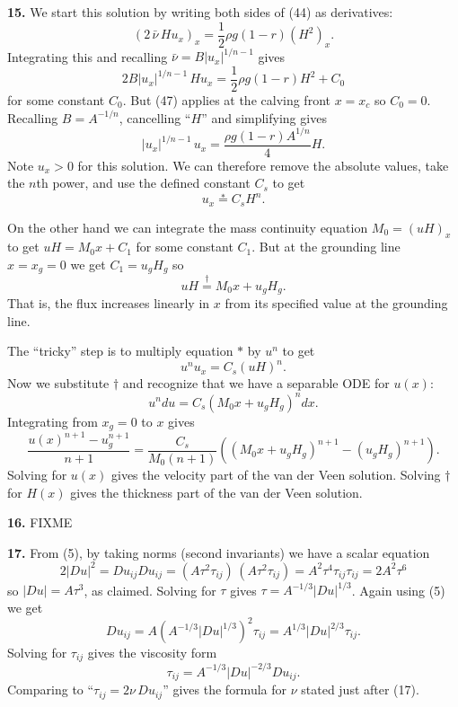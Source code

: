 \documentclass[10pt]{amsart}
\newcommand{\prob}[1]{\bigskip\noindent\large\textbf{#1.}\normalsize }
\begin{document}
\prob{15}  We start this solution by writing both sides of (44) as derivatives:
    $$\left(2 \,\bar\nu\, H u_x\right)_x = \frac{1}{2} \rho g (1-r) (H^2)_x.$$
Integrating this and recalling $\bar\nu = B |u_x|^{1/n - 1}$ gives
    $$2 B |u_x|^{1/n - 1}\, H u_x = \frac{1}{2} \rho g (1-r) H^2 + C_0$$
for some constant $C_0$.  But (47) applies at the calving front $x=x_c$ so $C_0=0$.  Recalling $B=A^{-1/n}$, cancelling ``$H$'' and simplifying gives
    $$|u_x|^{1/n - 1}\, u_x = \frac{\rho g (1-r) A^{1/n}}{4} H.$$
Note $u_x>0$ for this solution.  We can therefore remove the absolute values, take the $n$th power, and use the defined constant $C_s$ to get
    $$u_x \stackrel{\ast}{=} C_s H^n.$$

On the other hand we can integrate the mass continuity equation $M_0=(uH)_x$ to get $uH = M_0 x + C_1$ for some constant $C_1$.  But at the grounding line $x=x_g=0$ we get $C_1 = u_g H_g$ so
    $$u H \stackrel{\dagger}{=} M_0 x + u_g H_g.$$
That is, the flux increases linearly in $x$ from its specified value at the grounding line.

The ``tricky'' step is to multiply equation $\ast$ by $u^n$ to get
    $$u^n u_x = C_s (uH)^n.$$
Now we substitute $\dagger$ and recognize that we have a separable ODE for $u(x)$:
    $$u^n du = C_s (M_0 x + u_g H_g)^n dx.$$
Integrating from $x_g=0$ to $x$ gives
    $$\frac{u(x)^{n+1}-u_g^{n+1}}{n+1} = \frac{C_s}{M_0 (n+1)} \left((M_0 x + u_g H_g)^{n+1} - (u_g H_g)^{n+1}\right).$$
Solving for $u(x)$ gives the velocity part of the van der Veen solution.  Solving $\dagger$ for $H(x)$ gives the thickness part of the van der Veen solution.

\prob{16}  FIXME

\prob{17}  From (5), by taking norms (second invariants) we have a scalar equation
    $$2 |Du|^2 = Du_{ij} Du_{ij} = (A \tau^2 \tau_{ij})\,(A \tau^2 \tau_{ij}) = A^2 \tau^4 \tau_{ij} \tau_{ij} = 2 A^2 \tau^6$$
so $|Du|=A\tau^3$, as claimed.  Solving for $\tau$ gives $\tau = A^{-1/3} |Du|^{1/3}$.  Again using (5) we get
    $$Du_{ij} = A \left(A^{-1/3} |Du|^{1/3}\right)^2 \tau_{ij} = A^{1/3} |Du|^{2/3} \tau_{ij}.$$
Solving for $\tau_{ij}$ gives the viscosity form
    $$\tau_{ij} = A^{-1/3} |Du|^{-2/3} Du_{ij}.$$
Comparing to ``$\tau_{ij} = 2 \nu\, Du_{ij}$'' gives the formula for $\nu$ stated just after (17).
\end{document}
